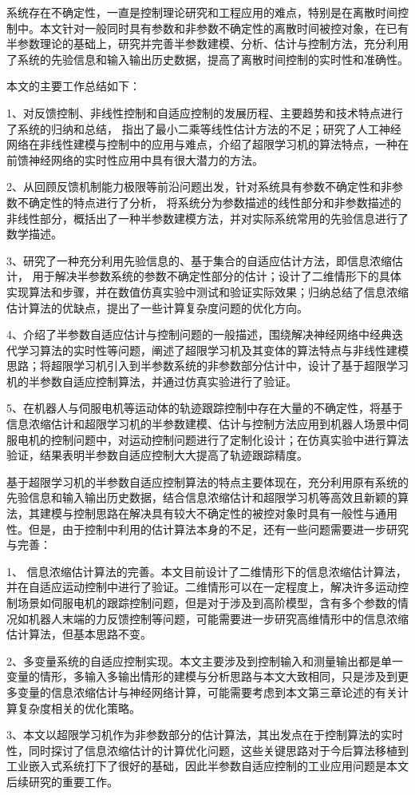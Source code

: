 
\begin{conclusion}
系统存在不确定性，一直是控制理论研究和工程应用的难点，特别是在离散时间控制中。本文针对一般同时具有参数和非参数不确定性的离散时间被控对象，在已有半参数理论的基础上，研究并完善半参数建模、分析、估计与控制方法，充分利用了系统的先验信息和输入输出历史数据，提高了离散时间控制的实时性和准确性。

本文的主要工作总结如下：

1、对反馈控制、非线性控制和自适应控制的发展历程、主要趋势和技术特点进行了系统的归纳和总结，
指出了最小二乘等线性估计方法的不足；研究了人工神经网络在非线性建模与控制中的应用与难点，介绍了超限学习机的算法特点，一种在前馈神经网络的实时性应用中具有很大潜力的方法。

2、从回顾反馈机制能力极限等前沿问题出发，针对系统具有参数不确定性和非参数不确定性的特点进行了分析，
将系统分为参数描述的线性部分和非参数描述的非线性部分，概括出了一种半参数建模方法，并对实际系统常用的先验信息进行了数学描述。

3、研究了一种充分利用先验信息的、基于集合的自适应估计方法，即信息浓缩估计，
用于解决半参数系统的参数不确定性部分的估计；设计了二维情形下的具体实现算法和步骤，并在数值仿真实验中测试和验证实际效果；归纳总结了信息浓缩估计算法的优缺点，提出了一些计算复杂度问题的优化方向。

4、介绍了半参数自适应估计与控制问题的一般描述，围绕解决神经网络中经典迭代学习算法的实时性等问题，阐述了超限学习机及其变体的算法特点与非线性建模思路；将超限学习机引入到半参数系统的非参数部分估计中，设计了基于超限学习机的半参数自适应控制算法，并通过仿真实验进行了验证。

5、在机器人与伺服电机等运动体的轨迹跟踪控制中存在大量的不确定性，将基于信息浓缩估计和超限学习机的半参数建模、估计与控制方法应用到机器人场景中伺服电机的控制问题中，对运动控制问题进行了定制化设计；在仿真实验中进行算法验证，结果表明半参数自适应控制大大提高了轨迹跟踪精度。

基于超限学习机的半参数自适应控制算法的特点主要体现在，充分利用原有系统的先验信息和输入输出历史数据，结合信息浓缩估计和超限学习机等高效且新颖的算法，其建模与控制思路在解决具有较大不确定性的被控对象时具有一般性与通用性。但是，由于控制中利用的估计算法本身的不足，还有一些问题需要进一步研究与完善：

1、 信息浓缩估计算法的完善。本文目前设计了二维情形下的信息浓缩估计算法，并在自适应运动控制中进行了验证。二维情形可以在一定程度上，解决许多运动控制场景如伺服电机的跟踪控制问题，但是对于涉及到高阶模型，含有多个参数的情况如机器人末端的力反馈控制等问题，可能需要进一步研究高维情形中的信息浓缩估计算法，但基本思路不变。

2、多变量系统的自适应控制实现。本文主要涉及到控制输入和测量输出都是单一变量的情形，多输入多输出情形的建模与分析思路与本文大致相同，只是涉及到更多变量的信息浓缩估计与神经网络计算，可能需要考虑到本文第三章论述的有关计算复杂度相关的优化策略。

3、本文以超限学习机作为非参数部分的估计算法，其出发点在于控制算法的实时性，同时探讨了信息浓缩估计的计算优化问题，这些关键思路对于今后算法移植到工业嵌入式系统打下了很好的基础，因此半参数自适应控制的工业应用问题是本文后续研究的重要工作。

\end{conclusion}